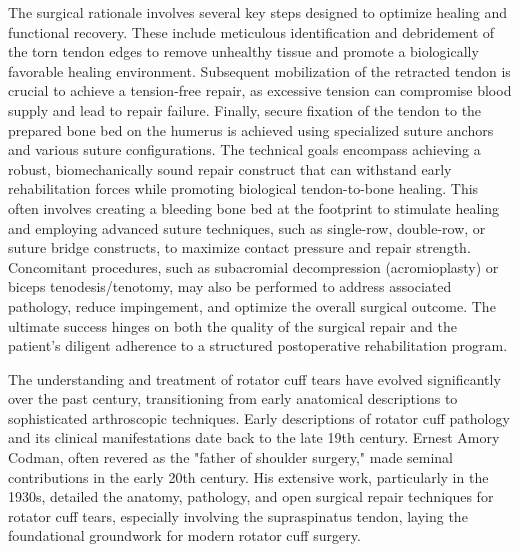 The surgical rationale involves several key steps designed to optimize healing and functional recovery. These include meticulous identification and debridement of the torn tendon edges to remove unhealthy tissue and promote a biologically favorable healing environment. Subsequent mobilization of the retracted tendon is crucial to achieve a tension-free repair, as excessive tension can compromise blood supply and lead to repair failure. Finally, secure fixation of the tendon to the prepared bone bed on the humerus is achieved using specialized suture anchors and various suture configurations. The technical goals encompass achieving a robust, biomechanically sound repair construct that can withstand early rehabilitation forces while promoting biological tendon-to-bone healing. This often involves creating a bleeding bone bed at the footprint to stimulate healing and employing advanced suture techniques, such as single-row, double-row, or suture bridge constructs, to maximize contact pressure and repair strength. Concomitant procedures, such as subacromial decompression (acromioplasty) or biceps tenodesis/tenotomy, may also be performed to address associated pathology, reduce impingement, and optimize the overall surgical outcome. The ultimate success hinges on both the quality of the surgical repair and the patient's diligent adherence to a structured postoperative rehabilitation program.

The understanding and treatment of rotator cuff tears have evolved significantly over the past century, transitioning from early anatomical descriptions to sophisticated arthroscopic techniques. Early descriptions of rotator cuff pathology and its clinical manifestations date back to the late 19th century. Ernest Amory Codman, often revered as the "father of shoulder surgery," made seminal contributions in the early 20th century. His extensive work, particularly in the 1930s, detailed the anatomy, pathology, and open surgical repair techniques for rotator cuff tears, especially involving the supraspinatus tendon, laying the foundational groundwork for modern rotator cuff surgery.

